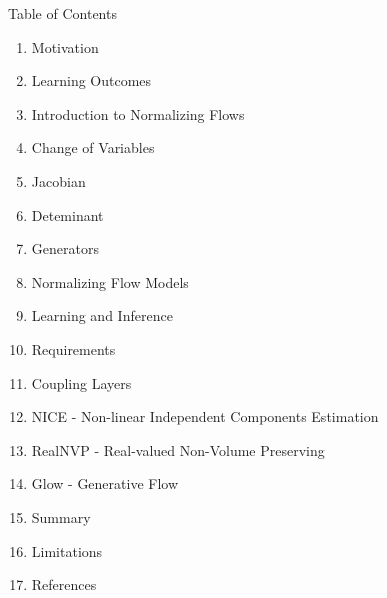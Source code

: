 \begin{frame}[allowframebreaks]{Table of Contents}
\begin{enumerate}
    \item Motivation
    \item Learning Outcomes
    \item Introduction to Normalizing Flows
    \item Change of Variables
    \item Jacobian
    \item Deteminant
    \item Generators
    \item Normalizing Flow Models
    \item Learning and Inference
    \item Requirements
    \item Coupling Layers
    \item NICE - Non-linear Independent Components Estimation
    \item RealNVP - Real-valued Non-Volume Preserving
    \item Glow - Generative Flow
    \item Summary
    \item Limitations
    \item References
\end{enumerate}
\end{frame}
